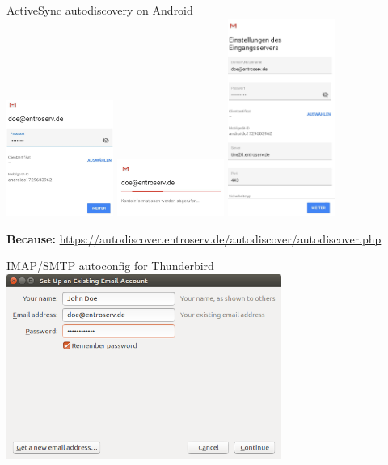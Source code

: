 \documentclass{beamer}
\begin{document}
\begin{frame}[fragile]{\insertsection}{\insertsubsection}
	\vspace{-0.5cm}
	ActiveSync autodiscovery on Android\\
	\includegraphics[width=3.5cm,valign=t]{autodiscoverAndroid1.jpg}
	\includegraphics[width=3.5cm,valign=t]{autodiscoverAndroid2.jpg}
	\includegraphics[width=3.5cm,valign=t]{autodiscoverAndroid3.jpg}

	\textbf{Because:} \url{https://autodiscover.entroserv.de/autodiscover/autodiscover.php}
\end{frame}	

\begin{frame}[fragile]{\insertsection}{\insertsubsection}
	\vspace{-0.5cm}
	IMAP/SMTP autoconfig for Thunderbird\\
	\includegraphics[width=9cm]{autoconfigTB1.png}\\
\end{frame}	
\end{document}
